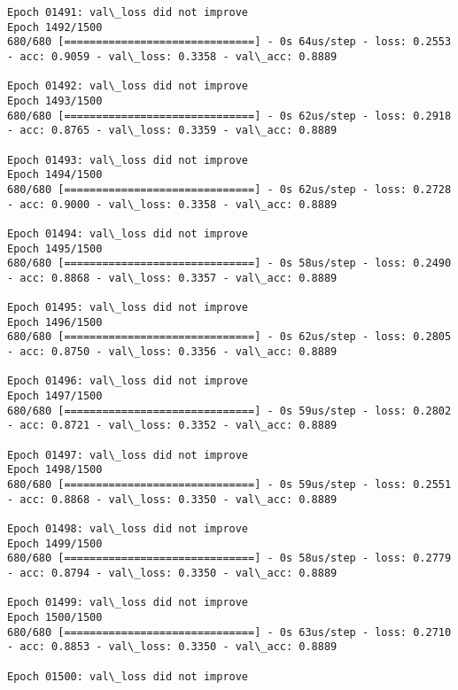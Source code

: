 \documentclass[11pt]{article}
\begin{document}
\begin{Verbatim}[commandchars=\\\{\}]
Epoch 01491: val\_loss did not improve
Epoch 1492/1500
680/680 [==============================] - 0s 64us/step - loss: 0.2553 - acc: 0.9059 - val\_loss: 0.3358 - val\_acc: 0.8889

Epoch 01492: val\_loss did not improve
Epoch 1493/1500
680/680 [==============================] - 0s 62us/step - loss: 0.2918 - acc: 0.8765 - val\_loss: 0.3359 - val\_acc: 0.8889

Epoch 01493: val\_loss did not improve
Epoch 1494/1500
680/680 [==============================] - 0s 62us/step - loss: 0.2728 - acc: 0.9000 - val\_loss: 0.3358 - val\_acc: 0.8889

Epoch 01494: val\_loss did not improve
Epoch 1495/1500
680/680 [==============================] - 0s 58us/step - loss: 0.2490 - acc: 0.8868 - val\_loss: 0.3357 - val\_acc: 0.8889

Epoch 01495: val\_loss did not improve
Epoch 1496/1500
680/680 [==============================] - 0s 62us/step - loss: 0.2805 - acc: 0.8750 - val\_loss: 0.3356 - val\_acc: 0.8889

Epoch 01496: val\_loss did not improve
Epoch 1497/1500
680/680 [==============================] - 0s 59us/step - loss: 0.2802 - acc: 0.8721 - val\_loss: 0.3352 - val\_acc: 0.8889

Epoch 01497: val\_loss did not improve
Epoch 1498/1500
680/680 [==============================] - 0s 59us/step - loss: 0.2551 - acc: 0.8868 - val\_loss: 0.3350 - val\_acc: 0.8889

Epoch 01498: val\_loss did not improve
Epoch 1499/1500
680/680 [==============================] - 0s 58us/step - loss: 0.2779 - acc: 0.8794 - val\_loss: 0.3350 - val\_acc: 0.8889

Epoch 01499: val\_loss did not improve
Epoch 1500/1500
680/680 [==============================] - 0s 63us/step - loss: 0.2710 - acc: 0.8853 - val\_loss: 0.3350 - val\_acc: 0.8889

Epoch 01500: val\_loss did not improve

    \end{Verbatim}
\end{document}
